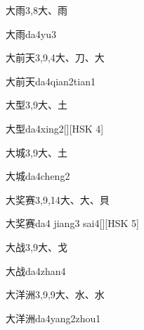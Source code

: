 \begin{entry}{大雨}{3,8}{⼤、⾬}
  \begin{phonetics}{大雨}{da4yu3}
  \end{phonetics}
\end{entry}

\begin{entry}{大前天}{3,9,4}{⼤、⼑、⼤}
  \begin{phonetics}{大前天}{da4qian2tian1}
  \end{phonetics}
\end{entry}

\begin{entry}{大型}{3,9}{⼤、⼟}
  \begin{phonetics}{大型}{da4xing2}[][HSK 4]
  \end{phonetics}
\end{entry}

\begin{entry}{大城}{3,9}{⼤、⼟}
  \begin{phonetics}{大城}{da4cheng2}
  \end{phonetics}
\end{entry}

\begin{entry}{大奖赛}{3,9,14}{⼤、⼤、⾙}
  \begin{phonetics}{大奖赛}{da4 jiang3 sai4}[][HSK 5]
  \end{phonetics}
\end{entry}

\begin{entry}{大战}{3,9}{⼤、⼽}
  \begin{phonetics}{大战}{da4zhan4}
  \end{phonetics}
\end{entry}

\begin{entry}{大洋洲}{3,9,9}{⼤、⽔、⽔}
  \begin{phonetics}{大洋洲}{da4yang2zhou1}
  \end{phonetics}
\end{entry}

